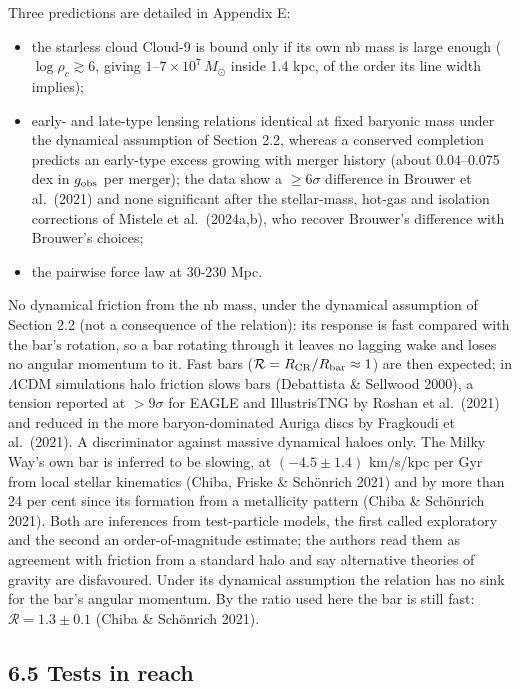\documentclass[
  10pt,
]{article}
\begin{document}
Three predictions are detailed in Appendix E:
\begin{itemize}
\item the starless cloud Cloud-9 is bound only if its own nb mass is large enough ($\log\rho_c\gtrsim6$, giving $1$--$7\times10^7\,M_\odot$ inside 1.4 kpc, of the order its line width implies);
\item early- and late-type lensing relations identical at fixed baryonic mass under the dynamical assumption of Section 2.2, whereas a conserved completion predicts an early-type excess growing with merger history (about 0.04--0.075 dex in $g_{\rm obs}$ per merger); the data show a $\ge6\sigma$ difference in Brouwer et al.~(2021) and none significant after the stellar-mass, hot-gas and isolation corrections of Mistele et al.~(2024a,b), who recover Brouwer's difference with Brouwer's choices;
\item the pairwise force law at 30-230 Mpc.
\end{itemize}
No dynamical friction from the nb mass, under the dynamical assumption of Section 2.2 (not a consequence of the relation): its response is fast compared with the bar's rotation, so a bar rotating through it leaves no lagging wake and loses no angular momentum to it. Fast bars ($\mathcal{R}=R_{\rm CR}/R_{\rm bar}\approx1$) are then expected; in $\Lambda$CDM simulations halo friction slows bars (Debattista \& Sellwood 2000), a tension reported at $>9\sigma$ for EAGLE and IllustrisTNG by Roshan et al.~(2021) and reduced in the more baryon-dominated Auriga discs by Fragkoudi et al.~(2021). A discriminator against massive dynamical haloes only. The Milky Way's own bar is inferred to be slowing, at $(-4.5\pm1.4)$ km/s/kpc per Gyr from local stellar kinematics (Chiba, Friske \& Sch\"onrich 2021) and by more than 24 per cent since its formation from a metallicity pattern (Chiba \& Sch\"onrich 2021). Both are inferences from test-particle models, the first called exploratory and the second an order-of-magnitude estimate; the authors read them as agreement with friction from a standard halo and say alternative theories of gravity are disfavoured. Under its dynamical assumption the relation has no sink for the bar's angular momentum. By the ratio used here the bar is still fast: $\mathcal{R}=1.3\pm0.1$ (Chiba \& Sch\"onrich 2021).

\subsection{6.5 Tests in reach}
\end{document}
